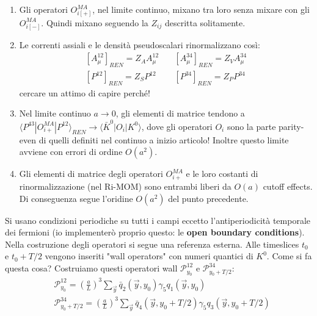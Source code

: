 \documentclass[12pt,a4paper,openright]{article}
\newcommand{\la}{\langle}
\newcommand{\ra}{\rangle}
\newcommand{\colg}{\textcolor{PineGreen}}
\newcommand{\colr}{\textcolor{BrickRed}}
\begin{document}
\begin{enumerate}
  \item Gli operatori $O_{i[+]}^{MA}$, nel limite continuo, mixano tra loro senza mixare con gli $O_{i[-]}^{MA}$. Quindi mixano seguendo la $Z_{ij}$ descritta solitamente.
  \item Le correnti assiali e le densità pseudoscalari rinormalizzano così:
        \begin{equation*}
          \begin{aligned}
            & [A_\mu^{12}]_{REN} = Z_A A_\mu^{12} &\quad [A_\mu^{34}]_{REN} = Z_V A_\mu^{34} &\\
            & [P^{12}]_{REN} = Z_S P^{12} &\quad [P^{34}]_{REN} = Z_P P^{34}
          \end{aligned}
        \end{equation*}
        \colr{cercare un attimo di capire perché!}
  \item Nel limite continuo ${a \rightarrow 0} $, gli elementi di matrice tendono a $\la P^{43} | O_{i+}^{MA} | P^{12} \ra_{REN} \longrightarrow \la \bar K^0 | O_i | K^0 \ra$, dove gli operatori $O_i$ sono la parte parity-even di quelli definiti nel continuo a inizio articolo!
        Inoltre questo limite avviene con errori di ordine $O(a^2)$.
  \item Gli elementi di matrice degli operatori $O_{i+}^{MA}$ e le loro costanti di rinormalizzazione (nel Ri-MOM) sono entrambi liberi da $O(a)$ cutoff effects.
        Di conseguenza segue l'oridine $O(a^2)$ del punto precedente.
\end{enumerate}
\colg{Si usano condizioni periodiche su tutti i campi eccetto l'antiperiodicità temporale dei fermioni} (\colg{io implementerò proprio questo: le {\bf open boundary conditions}}).
Nella costruzione degli operatori si segue una referenza esterna.
Alle timeslices $t_0$ e $t_0 + T/2$ vengono inseriti "wall operators" con numeri quantici di $K^0$. Come si fa questa cosa? 
Costruiamo questi operatori wall $\mathcal{P}^{12}_{y_0}$ e $\mathcal{P}^{34}_{y_0+T/2}$:
\begin{equation*}
  \begin{aligned}
    & \mathcal{P}^{12}_{y_0} = \left(\frac{a}{L}\right)^3 \sum_{\vec{y}} \bar{q}_2(\vec y, y_0) \gamma_5 q_1 (\vec y, y_0) \\
    & \mathcal{P}^{34}_{y_0+T/2} = \left(\frac{a}{L}\right)^3 \sum_{\vec{y}} \bar{q}_4(\vec y, y_0+T/2) \gamma_5 q_3 (\vec y, y_0+T/2)
  \end{aligned}
\end{equation*}
\end{document}
